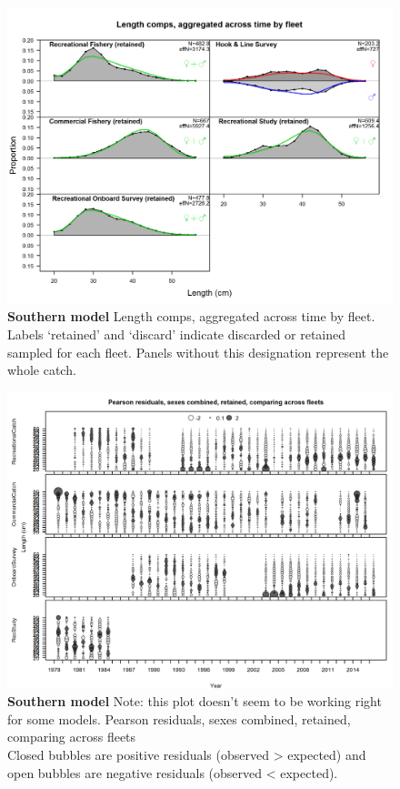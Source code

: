 \documentclass[12pt,]{article}
\begin{document}
\begin{figure}[htbp]
\centering
\includegraphics{./r4ss/plots_mod2/comp_lenfit__aggregated_across_time.png}
\caption{\textbf{Southern model} Length comps, aggregated across time by
fleet. Labels `retained' and `discard' indicate discarded or retained
sampled for each fleet. Panels without this designation represent the
whole catch. \label{fig:mod2_21_comp_lenfit__aggregated_across_time}}
\end{figure}

\begin{figure}[htbp]
\centering
\includegraphics{./r4ss/plots_mod2/comp_lenfit_sex1mkt2_multi-fleet_comparison.png}
\caption{\textbf{Southern model} Note: this plot doesn't seem to be
working right for some models. Pearson residuals, sexes combined,
retained, comparing across fleets\\
Closed bubbles are positive residuals (observed \textgreater{} expected)
and open bubbles are negative residuals (observed \textless{} expected).
\label{fig:mod2_22_comp_lenfit_sex1mkt2_multi-fleet_comparison}}
\end{figure}
\end{document}
